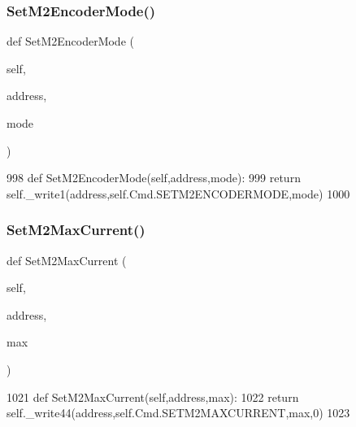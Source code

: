 \subsubsection{\texorpdfstring{Set\+M2\+Encoder\+Mode()}{SetM2EncoderMode()}}
{\footnotesize\ttfamily def Set\+M2\+Encoder\+Mode (\begin{DoxyParamCaption}\item[{}]{self,  }\item[{}]{address,  }\item[{}]{mode }\end{DoxyParamCaption})}


\begin{DoxyCode}
998     \textcolor{keyword}{def }SetM2EncoderMode(self,address,mode):
999         \textcolor{keywordflow}{return} self.\_write1(address,self.Cmd.SETM2ENCODERMODE,mode)
1000 
\end{DoxyCode}
\mbox{\label{classtoxic__hardware_1_1roboclaw__3_1_1Roboclaw_a863297bf33c9dcec1d3c73c835a3d18d}} 
\subsubsection{\texorpdfstring{Set\+M2\+Max\+Current()}{SetM2MaxCurrent()}}
{\footnotesize\ttfamily def Set\+M2\+Max\+Current (\begin{DoxyParamCaption}\item[{}]{self,  }\item[{}]{address,  }\item[{}]{max }\end{DoxyParamCaption})}


\begin{DoxyCode}
1021     \textcolor{keyword}{def }SetM2MaxCurrent(self,address,max):
1022         \textcolor{keywordflow}{return} self.\_write44(address,self.Cmd.SETM2MAXCURRENT,max,0)
1023 
\end{DoxyCode}
\mbox{\label{classtoxic__hardware_1_1roboclaw__3_1_1Roboclaw_af20c35ba0d15081a0fe691601b7457e7}} 
